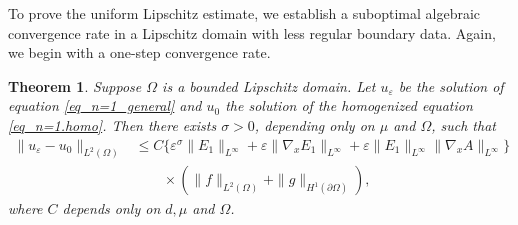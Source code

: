 \documentclass[reqno,12pt]{amsart} %
\newtheorem{theorem}{Theorem}[section]
\theoremstyle{definition}
\theoremstyle{remark}
\numberwithin{equation}{section}
\begin{document}

To prove the uniform Lipschitz estimate, we establish a suboptimal algebraic convergence rate in a Lipschitz domain with less regular boundary data. Again, we begin with a one-step convergence rate.
\begin{theorem}\label{thm_suboptimal}
  Suppose $\Omega$ is a bounded Lipschitz domain. Let $u_\varepsilon$ be the solution of equation \eqref{eq_n=1_general} and $u_0$ the solution of the homogenized equation \eqref{eq_n=1.homo}. Then there exists $\sigma>0$, depending only on $\mu $ and $\Omega$, such that
  \begin{align*}
    \|u_\varepsilon-u_0\|_{L^2(\Omega)}&\leq C\big\{ \varepsilon^{\sigma}\|E_1\|_{L^\infty}+\varepsilon\|\nabla_x E_1\|_{L^\infty}+\varepsilon\|E_1\|_{L^\infty}\|\nabla_xA\|_{L^\infty} \big\} \\
    & \qquad \times (\|f\|_{L^2(\Omega)} + \|g\|_{H^1(\partial\Omega)} ),
  \end{align*}
  where $C$ depends only on $d, \mu$ and $\Omega$. 
\end{theorem}
\end{document}
